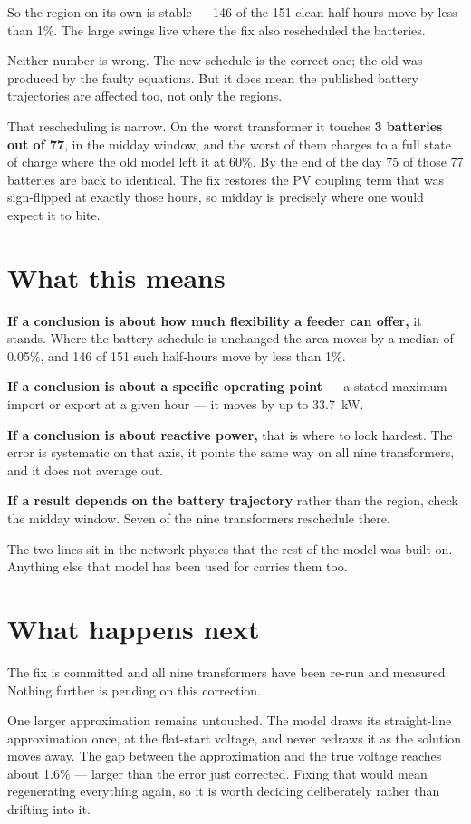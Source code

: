 \documentclass[11pt,a4paper]{article}
\begin{document}
So the region on its own is stable --- 146 of the 151 clean half-hours move by less than
1\%. The large swings live where the fix also rescheduled the batteries.

Neither number is wrong. The new schedule is the correct one; the old was produced by the
faulty equations. But it does mean the published battery trajectories are affected too,
not only the regions.

That rescheduling is narrow. On the worst transformer it touches \textbf{3 batteries out
of 77}, in the midday window, and the worst of them charges to a full state of charge
where the old model left it at 60\%. By the end of the day 75 of those 77 batteries are
back to identical. The fix restores the PV coupling term that was sign-flipped at exactly
those hours, so midday is precisely where one would expect it to bite.

\section{What this means}

\begin{tcolorbox}[colback=panel,colframe=rule,boxrule=0.7pt,arc=2pt,
                  left=10pt,right=10pt,top=9pt,bottom=9pt]
\textbf{If a conclusion is about how much flexibility a feeder can offer,} it stands.
Where the battery schedule is unchanged the area moves by a median of 0.05\%, and 146 of
151 such half-hours move by less than 1\%.

\textbf{If a conclusion is about a specific operating point} --- a stated maximum import
or export at a given hour --- it moves by up to 33.7~kW.

\textbf{If a conclusion is about reactive power,} that is where to look hardest. The error
is systematic on that axis, it points the same way on all nine transformers, and it does
not average out.

\textbf{If a result depends on the battery trajectory} rather than the region, check the
midday window. Seven of the nine transformers reschedule there.
\end{tcolorbox}

The two lines sit in the network physics that the rest of the model was built on. Anything
else that model has been used for carries them too.

\section{What happens next}

The fix is committed and all nine transformers have been re-run and measured. Nothing
further is pending on this correction.

One larger approximation remains untouched. The model draws its straight-line
approximation once, at the flat-start voltage, and never redraws it as the solution moves
away. The gap between the approximation and the true voltage reaches about 1.6\% ---
larger than the error just corrected. Fixing that would mean regenerating everything
again, so it is worth deciding deliberately rather than drifting into it.
\end{document}
